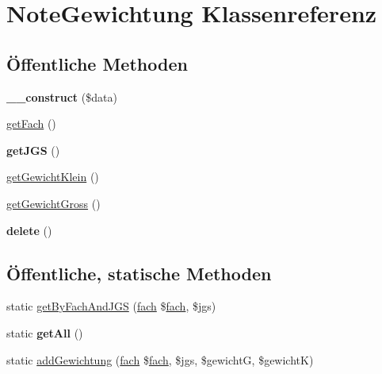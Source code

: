 \hypertarget{class_note_gewichtung}{}\section{Note\+Gewichtung Klassenreferenz}
\label{class_note_gewichtung}
\subsection*{Öffentliche Methoden}
\begin{DoxyCompactItemize}
\item 
\mbox{\label{class_note_gewichtung_a6ef219d159645d4c745ae069279c03a7}} 
{\bfseries \+\_\+\+\_\+construct} (\$data)
\item 
\mbox{\hyperlink{class_note_gewichtung_a3213b31c33c8e4b52de2b341ac58a739}{get\+Fach}} ()
\item 
\mbox{\label{class_note_gewichtung_ac374b8b6631da37b00c3cbd01fac4d50}} 
{\bfseries get\+J\+GS} ()
\item 
\mbox{\hyperlink{class_note_gewichtung_a3db16bd34477a30b7c99164a622227e7}{get\+Gewicht\+Klein}} ()
\item 
\mbox{\hyperlink{class_note_gewichtung_ae10b3c4ab94e2592c9834c427a32a23c}{get\+Gewicht\+Gross}} ()
\item 
\mbox{\label{class_note_gewichtung_a4a5d55f2d19c9beaa49d7d67308f3336}} 
{\bfseries delete} ()
\end{DoxyCompactItemize}
\subsection*{Öffentliche, statische Methoden}
\begin{DoxyCompactItemize}
\item 
static \mbox{\hyperlink{class_note_gewichtung_a2562fb9900e489b6ae2ea4c5af0ec5b5}{get\+By\+Fach\+And\+J\+GS}} (\mbox{\hyperlink{classfach}{fach}} \$\mbox{\hyperlink{classfach}{fach}}, \$jgs)
\item 
\mbox{\label{class_note_gewichtung_ac3200c2a980d8ad74e047eb30f271d02}} 
static {\bfseries get\+All} ()
\item 
static \mbox{\hyperlink{class_note_gewichtung_a57a929705fd7deae4e9746a7306bdce2}{add\+Gewichtung}} (\mbox{\hyperlink{classfach}{fach}} \$\mbox{\hyperlink{classfach}{fach}}, \$jgs, \$gewichtG, \$gewichtK)
\end{DoxyCompactItemize}


